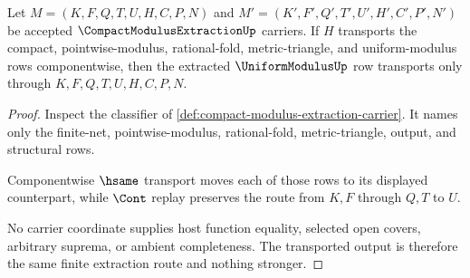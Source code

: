 \begin{theorem}
\label{thm:compact-modulus-extraction-transport-nonescape}
Let $M=(K,F,Q,T,U,H,C,P,N)$ and $M'=(K',F',Q',T',U',H',C',P',N')$ be accepted $\CompactModulusExtractionUp$ carriers. If $H$ transports the compact, pointwise-modulus, rational-fold, metric-triangle, and uniform-modulus rows componentwise, then the extracted $\UniformModulusUp$ row transports only through $K,F,Q,T,U,H,C,P,N$.
\end{theorem}
\begin{proof}
Inspect the classifier of \autoref{def:compact-modulus-extraction-carrier}. It names only the finite-net, pointwise-modulus, rational-fold, metric-triangle, output, and structural rows.

Componentwise $\hsame$ transport moves each of those rows to its displayed counterpart, while $\Cont$ replay preserves the route from $K,F$ through $Q,T$ to $U$.

No carrier coordinate supplies host function equality, selected open covers, arbitrary suprema, or ambient completeness. The transported output is therefore the same finite extraction route and nothing stronger.
\end{proof}




